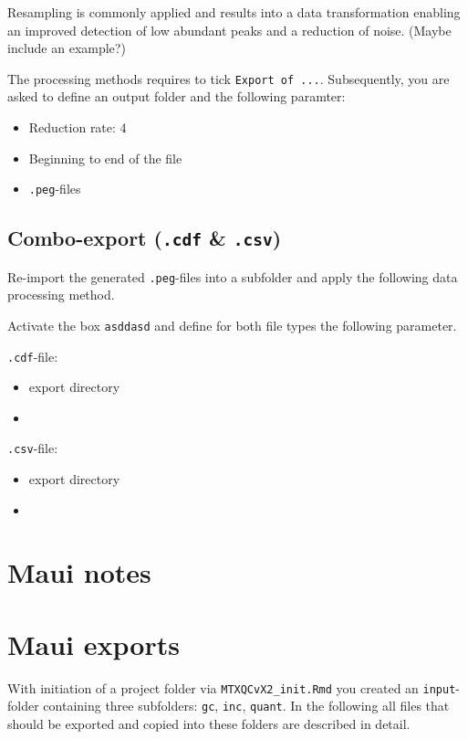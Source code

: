 \documentclass[]{book}
\providecommand{\tightlist}{%
  \setlength{\itemsep}{0pt}\setlength{\parskip}{0pt}}
\theoremstyle{definition}
\theoremstyle{definition}
\theoremstyle{definition}
\theoremstyle{remark}
\begin{document}
Resampling is commonly applied and results into a data transformation
enabling an improved detection of low abundant peaks and a reduction of
noise. (Maybe include an example?)

The processing methods requires to tick \texttt{Export\ of\ ...}.
Subsequently, you are asked to define an output folder and the following
paramter:

\begin{itemize}
\tightlist
\item
  Reduction rate: 4
\item
  Beginning to end of the file
\item
  \texttt{.peg}-files
\end{itemize}

\subsection{\texorpdfstring{Combo-export (\texttt{.cdf} \&
\texttt{.csv})}{Combo-export (.cdf \& .csv)}}\label{combo-export-.cdf-.csv}

Re-import the generated \texttt{.peg}-files into a subfolder and apply
the following data processing method.

Activate the box \texttt{asddasd} and define for both file types the
following parameter.

\texttt{.cdf}-file:

\begin{itemize}
\item
  export directory
\item
\end{itemize}

\texttt{.csv}-file:

\begin{itemize}
\item
  export directory
\item
\end{itemize}

\section{Maui notes}\label{maui-notes}

\section{Maui exports}\label{mauiexport}

With initiation of a project folder via \texttt{MTXQCvX2\_init.Rmd} you
created an \texttt{input}-folder containing three subfolders:
\texttt{gc}, \texttt{inc}, \texttt{quant}. In the following all files
that should be exported and copied into these folders are described in
detail.
\end{document}
